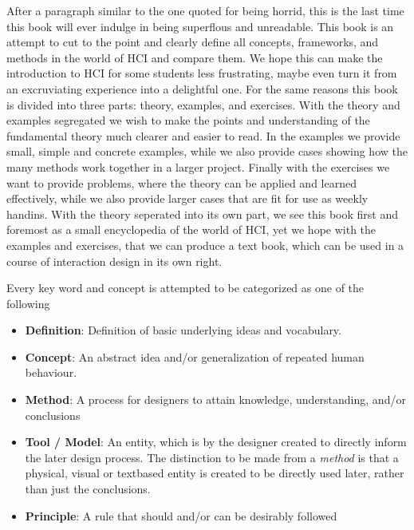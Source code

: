 After a paragraph similar to the one quoted for being horrid, this is the last
time this book will ever indulge in being superflous and unreadable. This book
is an attempt to cut to the point and clearly define all concepts, frameworks,
and methods in the world of HCI and compare them. We hope this can make the
introduction to HCI for some students less frustrating, maybe even turn it from
an excruviating experience into a delightful one. For the same reasons this book
is divided into three parts: theory, examples, and exercises. With the theory
and examples segregated we wish to make the points and understanding of the
fundamental theory much clearer and easier to read. In the examples we provide
small, simple and concrete examples, while we also provide cases showing how the
many methods work together in a larger project. Finally with the exercises we
want to provide problems, where the theory can be applied and learned
effectively, while we also provide larger cases that are fit for use as weekly
handins. With the theory seperated into its own part, we see this book first and
foremost as a small encyclopedia of the world of HCI, yet we hope with the
examples and exercises, that we can produce a text book, which can be used in a
course of interaction design in its own right.

Every key word and concept is attempted to be categorized as one of the following
\begin{itemize}
\item \textbf{Definition}: Definition of basic underlying ideas and vocabulary.

   \item \textbf{Concept}: An abstract idea and/or generalization of repeated
     human behaviour.


   \item \textbf{Method}: A process for designers to attain knowledge,
     understanding, and/or conclusions

   \item \textbf{Tool / Model}: An entity, which is by the designer created to
     directly inform the later design process. The distinction to be made from a
     \emph{method} is that a physical, visual or textbased entity is created to
     be directly used later, rather than just the conclusions.

     \item \textbf{Principle}: A rule that should and/or can be desirably followed
\end{itemize}

